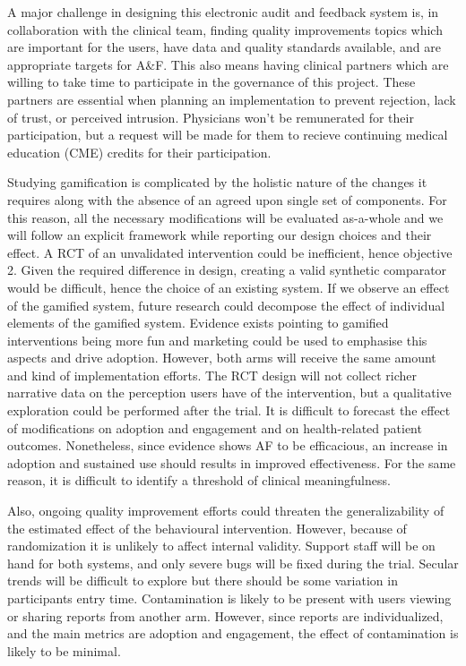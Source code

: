 A major challenge in designing this electronic audit and feedback system is, in collaboration with the clinical team, finding quality improvements topics which are important for the users, have data and quality standards available, and are appropriate targets for A\&F. This also means having clinical partners which are willing to take time to participate in the governance of this project. These partners are essential when planning an implementation to prevent rejection, lack of trust, or perceived intrusion. Physicians won't be remunerated for their participation, but a request will be made for them to recieve continuing medical education (CME) credits for their participation.

Studying gamification is complicated by the holistic nature of the changes it requires along with the absence of an agreed upon single set of components. For this reason, all the necessary modifications will be evaluated as-a-whole and we will follow an explicit framework while reporting our design choices and their effect. A RCT of an unvalidated intervention could be inefficient, hence objective 2. Given the required difference in design, creating a valid synthetic comparator would be difficult, hence the choice of an existing system. If we observe an effect of the gamified system, future research could decompose the effect of individual elements of the gamified system. Evidence exists pointing to gamified interventions being more fun and marketing could be used to emphasise this aspects and drive adoption. However, both arms will receive the same amount and kind of implementation efforts. The RCT design will not collect richer narrative data on the perception users have of the intervention, but a qualitative exploration could be performed after the trial. It is difficult to forecast the effect of modifications on adoption and engagement and on health-related patient outcomes. Nonetheless, since evidence shows \gls{AF} to be efficacious, an increase in adoption and sustained use should results in improved effectiveness. For the same reason, it is difficult to identify a threshold of clinical meaningfulness.

Also, ongoing quality improvement efforts could threaten the generalizability of the estimated effect of the behavioural intervention. However, because of randomization it is unlikely to affect internal validity. Support staff will be on hand for both systems, and only severe bugs will be fixed during the trial. Secular trends will be difficult to explore but there should be some variation in participants entry time. Contamination is likely to be present with users viewing or sharing reports from another arm. However, since reports are individualized, and the main metrics are adoption and engagement, the effect of contamination is likely to be minimal.



